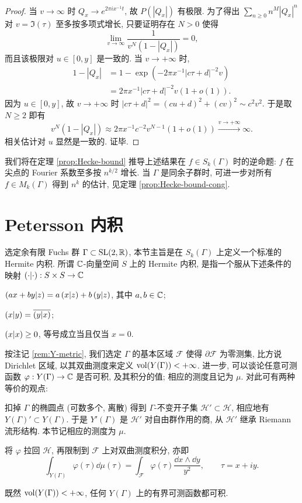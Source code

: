 \begin{proof}
	当 $v \to \infty$ 时 $Q_x \to e^{2\pi ix^{-1} t}$, 故 $P(|Q_x|)$ 有极限. 为了得出 $\sum_{n \geq 0} n^M |Q_x|^n$ 对 $v = \Im(\tau)$ 至多按多项式增长, 只要证明存在 $N > 0$ 使得
	\[ \lim_{v \to \infty} \dfrac{1}{v^N \left( 1 - |Q_x| \right) } = 0, \]
	而且该极限对 $u \in [0, y]$ 是一致的. 当 $v \to +\infty$ 时,
	\begin{align*}
		1 - |Q_x| & =  1 - \exp\left( -2\pi x^{-1} |c\tau + d|^{-2} v \right) \\
		& = 2\pi x^{-1} |c\tau + d|^{-2} v \left( 1 + o(1) \right).
	\end{align*}
	因为 $u \in [0, y]$, 故 $v \to +\infty$ 时 $|c\tau + d|^2 = (cu+d)^2 + (cv)^2 \sim c^2 v^2$. 于是取 $N \geq 2$ 即有
	\[ v^N \left( 1 - |Q_x| \right) \approx 2\pi x^{-1}c^{-2} v^{N-1} (1 + o(1)) \xrightarrow{v \to +\infty} \infty. \]
	相关估计对 $u$ 显然是一致的. 证毕.
\end{proof}

我们将在定理 \ref{prop:Hecke-bound} 推导上述结果在 $f \in S_k(\Gamma)$ 时的逆命题: $f$ 在尖点的 Fourier 系数至多按 $n^{k/2}$ 增长. 当 $\Gamma$ 是同余子群时, 可进一步对所有 $f \in M_k(\Gamma)$ 得到 $n^k$ 的估计, 见定理 \ref{prop:Hecke-bound-cong}.

\section{Petersson 内积}\label{sec:Petersson}
选定余有限 Fuchs 群 $\Gamma \subset \operatorname{SL}(2,\mathbb{R})$, 本节主旨是在 $S_k(\Gamma)$ 上定义一个标准的 Hermite 内积. 所谓 $\mathbb{C}$-向量空间 $S$ 上的 Hermite 内积, 是指一个服从下述条件的映射 $\left( \cdot \middle| \cdot \right): S \times S \to \mathbb{C}$
\begin{compactitem}
	\item $\left( ax+by \middle| z \right) = a\left( x \middle| z \right) + b\left( y \middle| z \right)$, 其中 $a,b \in \mathbb{C}$;
	\item $\left( x \middle| y \right) = \overline{\left( y \middle| x \right)}$;
	\item $\left( x \middle| x \right) \geq 0$, 等号成立当且仅当 $x=0$.
\end{compactitem}

按注记 \ref{rem:Y-metric}, 我们选定 $\Gamma$ 的基本区域 $\mathcal{F}$ 使得 $\partial \mathcal{F}$ 为零测集, 比方说 Dirichlet 区域, 以其双曲测度来定义 $\operatorname{vol}(Y(\Gamma)) < +\infty$. 进一步, 可以谈论任意可测函数 $\varphi: Y(\Gamma) \to \mathbb{C}$ 是否可积, 及其积分的值; 相应的测度且记为 $\mu$. 对此可有两种等价的观点:
\begin{compactitem}
	\item 扣掉 $\Gamma$ 的椭圆点 (可数多个, 离散) 得到 $\Gamma$-不变开子集 $\mathcal{H}' \subset \mathcal{H}$, 相应地有 $Y(\Gamma)' \subset Y(\Gamma)$. 于是 $Y'(\Gamma)$ 是 $\mathcal{H}'$ 对自由群作用的商, 从 $\mathcal{H}'$ 继承 Riemann 流形结构. 本节记相应的测度为 $\mu$.
	\item 将 $\varphi$ 拉回 $\mathcal{H}$, 再限制到 $\mathcal{F}$ 上对双曲测度积分, 亦即
	\[ \int_{Y(\Gamma)} \varphi(\tau) \dd\mu(\tau) = \int_{\mathcal{F}} \varphi(\tau) \dfrac{\dd x \wedge \dd y}{y^2}, \qquad \tau = x + iy. \]
\end{compactitem}
既然 $\operatorname{vol}(Y(\Gamma)) < +\infty$, 任何 $Y(\Gamma)$ 上的有界可测函数都可积.

